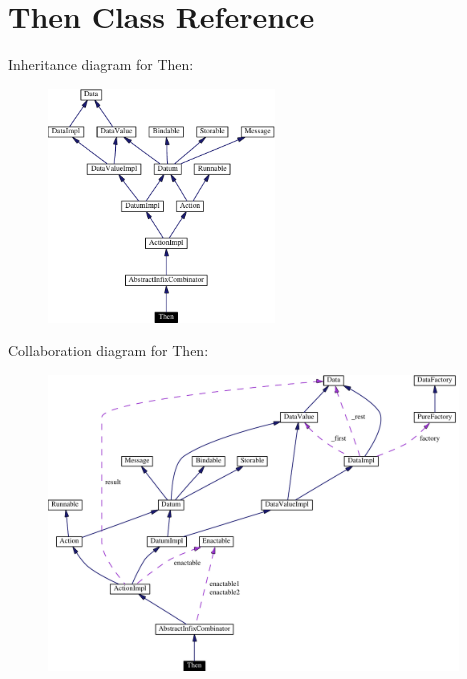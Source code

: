 \hypertarget{classThen}{
\section{Then  Class Reference}
\label{classThen}
}
Inheritance diagram for Then:\begin{figure}[H]
\begin{center}
\leavevmode
\includegraphics[width=170pt]{classThen__inherit__graph}
\end{center}
\end{figure}
Collaboration diagram for Then:\begin{figure}[H]
\begin{center}
\leavevmode
\includegraphics[width=308pt]{classThen__coll__graph}
\end{center}
\end{figure}
